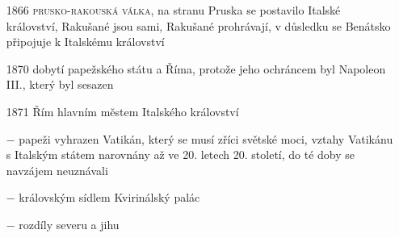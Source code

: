 \documentclass{article}
\begin{document}
\begin{itemize}
    \item[1866] \textsc{prusko-rakouská válka}, na stranu Pruska se postavilo Italské království, Rakušané jsou sami, Rakušané prohrávají, v důsledku se Benátsko připojuje k Italskému království
    \item[1870] dobytí papežského státu a Říma, protože jeho ochráncem byl Napoleon III., který byl sesazen
    \item[1871] Řím hlavním městem Italského království
    \item[$-$] papeži vyhrazen Vatikán, který se musí zříci světské moci, vztahy Vatikánu  s Italským státem narovnány až ve 20. letech 20. století, do té doby se navzájem neuznávali
    \item[$-$] královským sídlem Kvirinálský palác
    \item[$-$] rozdíly severu a jihu
\end{itemize}
\end{document}
